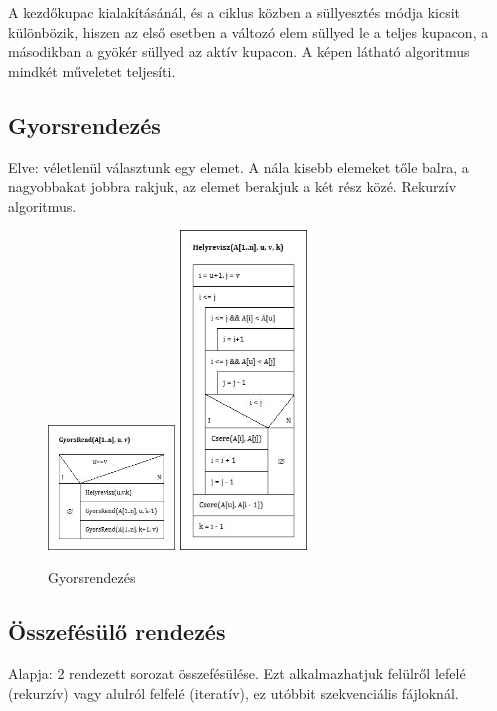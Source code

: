 \documentclass[margin=0px]{article}
\begin{document}
	A kezdőkupac kialakításánál, és a ciklus közben a süllyesztés módja kicsit különbözik, hiszen az első esetben a változó elem süllyed le a teljes kupacon, a másodikban a gyökér süllyed az aktív kupacon. A képen látható algoritmus mindkét műveletet teljesíti.
	
	\subsection{Gyorsrendezés}
	
	Elve: véletlenül választunk egy elemet. A nála kisebb elemeket tőle balra, a nagyobbakat jobbra rakjuk, az elemet berakjuk a két rész közé. Rekurzív algoritmus.
	\begin{figure}[H]
		\centering
		\includegraphics[width=0.3\textwidth]{img/GyorsRend.jpg}
		\includegraphics[width=0.3\textwidth]{img/Helyrevisz.jpg}
		\caption{Gyorsrendezés}
	\end{figure}
	
	\subsection{Összefésülő rendezés}
	
	Alapja: 2 rendezett sorozat összefésülése. Ezt alkalmazhatjuk felülről lefelé (rekurzív) vagy alulról felfelé (iteratív), ez utóbbit szekvenciális fájloknál.

\end{document}
